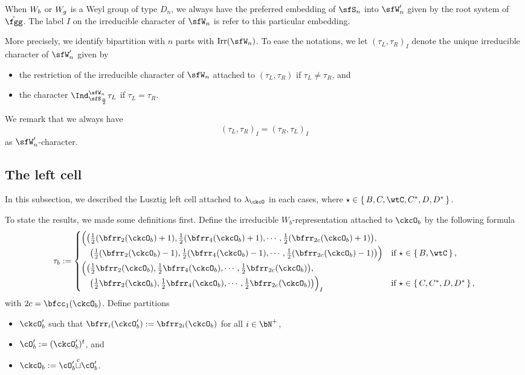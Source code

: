 \documentclass[12pt,a4paper]{amsart}
\numberwithin{equation}{section}
\theoremstyle{remark}
\def\half{{\tfrac{1}{2}}}
\def\Irr{\mathrm{Irr}}
\def\cupcol{{\stackrel{c}{\sqcup}}}
\def\ckfgg{{\check \fgg}}
\begin{document}
  When $W_{b}$ or $W_{g}$ is a Weyl group of type $D_{n}$, we always have the
  preferred embedding of $\sfS_{n}$ into $\sfW'_{n}$ given by the root system of
  $\ckfgg$. The label $I$ on the irreducible character of $\sfW_{n}$ is refer to
  this particular embedding.

  More precisely, we identify bipartition with $n$ parts with $\Irr(\sfW_{n})$.
  To ease the notations, we let $(\tau_{L},\tau_{R})_{I}$ denote
  the unique irreducible character of $\sfW'_{n}$ given by
  \begin{itemize}
    \item the restriction of
    the irreducible character of $\sfW_{n}$ attached to $(\tau_{L},\tau_{R})$ if
    $\tau_{L}\neq \tau_{R}$, and
    \item
    the character
    $\Ind_{\sfS_{\frac{n}{2}}}^{\sfW_{n}} \tau_{L}$ if $\tau_{L}=\tau_{R}$.
  \end{itemize}
  We remark that we always have
  \[
    (\tau_{L},\tau_{R})_{I}=(\tau_{R},\tau_{L})_{I}
  \]
  as $\sfW'_{n}$-character.


  \subsection{The left cell}
  In this subsection, we described the Lusztig left cell attached to
  $\lambda_{\ckcO}$ in each cases, where $\star \in \set{B,C,\wtC,C^{*},D,D^{*}}$.


  To state the results, we made some definitions first.
  Define the irreducible  $W_{b}$-representation attached to $\ckcO_{b}$ by the following formula
  \[
    \tau_{b} := \begin{cases}
      \Big(\big(\half(\bfrr_{2}(\ckcO_{b})+1), \half(\bfrr_{4}(\ckcO_{b})+1), \cdots, \half(\bfrr_{2c}(\ckcO_{b})+1)\big),\\
       \hspace{1em}\big(\half(\bfrr_{2}(\ckcO_{b})-1), \half(\bfrr_{4}(\ckcO_{b})-1), \cdots, \half(\bfrr_{2c}(\ckcO_{b})-1) \big)\Big)
      & \text{if } \star \in \set{B,\wtC},\\
      \Big( \big(\half\bfrr_{2}(\ckcO_{b}), \half\bfrr_{4}(\ckcO_{b}),\cdots, \half\bfrr_{2c}(\ckcO_{b})\big), \\
      \hspace{1em} \big(\half\bfrr_{2}(\ckcO_{b}), \half\bfrr_{4}(\ckcO_{b}),\cdots, \half\bfrr_{2c}(\ckcO_{b}) \big)\Big)_{I}
      & \text{if } \star \in \set{C,C^{*}, D,D^{*}},\\
    \end{cases}
  \]
  with $2c = \bfcc_{1}(\ckcO_{b})$.
  Define partitions
  \begin{itemize}
    \item $\ckcO'_{b}$ such that $\bfrr_{i}(\ckcO'_{b}):= \bfrr_{2i}(\ckcO_{b})$
          for all $i\in \bN^{+}$,
    \item $\cO'_{b}:= (\ckcO'_{b})^{t}$, and
    \item $\ckcO_{b}:= \cO'_{b}\cupcol \cO'_{b}$.
  \end{itemize}
\end{document}
